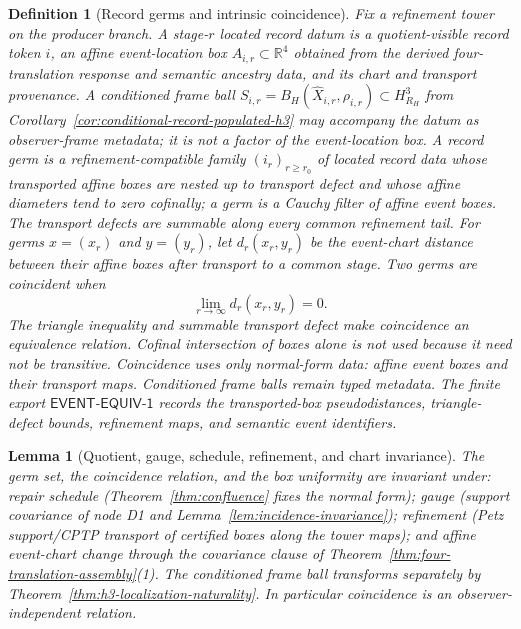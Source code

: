 \documentclass[11pt]{article}
\newtheorem{lemma}[theorem]{Lemma}
\newtheorem{definition}[theorem]{Definition}
\begin{document}
\begin{definition}[Record germs and intrinsic coincidence]
\label{def:record-coincidence}
Fix a refinement tower on the producer branch. A stage-\(r\) \emph{located
record datum} is a quotient-visible record token \(i\), an affine event-location
box \(A_{i,r}\subset\mathbb R^4\) obtained from the derived four-translation response
and semantic ancestry data, and its chart and transport provenance. A conditioned
frame ball
\(S_{i,r}=B_H(\widehat X_{i,r},\rho_{i,r})\subset H^3_{R_H}\) from
Corollary~\ref{cor:conditional-record-populated-h3} may accompany the datum as
observer-frame metadata; it is not a factor of the event-location box. A
\emph{record germ} is a refinement-compatible family \((i_r)_{r\geq r_0}\) of
located record data whose transported affine boxes are nested up to transport
defect and whose affine diameters tend to zero cofinally; a germ is a Cauchy
filter of affine event boxes. The transport defects are summable along every
common refinement tail. For germs \(x=(x_r)\) and \(y=(y_r)\), let
\(d_r(x_r,y_r)\) be the event-chart distance between their affine boxes after
transport to a common stage.
Two germs are \emph{coincident} when
\[
\lim_{r\to\infty}d_r(x_r,y_r)=0.
\]
The triangle inequality and summable transport defect make coincidence an
equivalence relation. Cofinal intersection of boxes alone is not used because
it need not be transitive. Coincidence uses only normal-form data: affine event
boxes and their transport maps. Conditioned frame balls remain typed metadata.
The finite export \(\mathsf{EVENT\text{-}EQUIV\text{-}1}\) records the transported-box
pseudodistances, triangle-defect bounds, refinement maps, and semantic event identifiers.
\end{definition}

\begin{lemma}[Quotient, gauge, schedule, refinement, and chart invariance]
\label{lem:event-quotient-invariance}
The germ set, the coincidence relation, and the box uniformity are invariant
under: repair schedule (Theorem~\ref{thm:confluence} fixes the normal form);
gauge (support covariance of node D1 and
Lemma~\ref{lem:incidence-invariance}); refinement (Petz support/CPTP transport
of certified boxes along the tower maps); and affine event-chart change through
the covariance clause of Theorem~\ref{thm:four-translation-assembly}(1). The
conditioned frame ball transforms separately by
Theorem~\ref{thm:h3-localization-naturality}. In particular coincidence is an
observer-independent relation.
\end{lemma}
\end{document}
